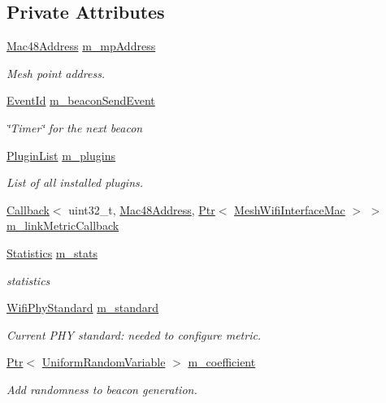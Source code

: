 \subsection*{Private Attributes}
\begin{DoxyCompactItemize}
\item 
\hyperlink{classns3_1_1Mac48Address}{Mac48\+Address} \hyperlink{classns3_1_1MeshWifiInterfaceMac_a268937434a33acb600cd45d4163eba32}{m\+\_\+mp\+Address}
\begin{DoxyCompactList}\small\item\em Mesh point address. \end{DoxyCompactList}\item 
\hyperlink{classns3_1_1EventId}{Event\+Id} \hyperlink{classns3_1_1MeshWifiInterfaceMac_a631ce3de769470f4f3e4bf92a95c54ba}{m\+\_\+beacon\+Send\+Event}
\begin{DoxyCompactList}\small\item\em \char`\"{}\+Timer\char`\"{} for the next beacon \end{DoxyCompactList}\item 
\hyperlink{classns3_1_1MeshWifiInterfaceMac_aef7248bc33791dc738bd042c5459ad88}{Plugin\+List} \hyperlink{classns3_1_1MeshWifiInterfaceMac_ace0a54623c4daa3e9fc7f5570a84683c}{m\+\_\+plugins}
\begin{DoxyCompactList}\small\item\em List of all installed plugins. \end{DoxyCompactList}\item 
\hyperlink{classns3_1_1Callback}{Callback}$<$ uint32\+\_\+t, \hyperlink{classns3_1_1Mac48Address}{Mac48\+Address}, \hyperlink{classns3_1_1Ptr}{Ptr}$<$ \hyperlink{classns3_1_1MeshWifiInterfaceMac}{Mesh\+Wifi\+Interface\+Mac} $>$ $>$ \hyperlink{classns3_1_1MeshWifiInterfaceMac_a618f4cf314716f9b006ff39f37553c5a}{m\+\_\+link\+Metric\+Callback}
\item 
\hyperlink{structns3_1_1MeshWifiInterfaceMac_1_1Statistics}{Statistics} \hyperlink{classns3_1_1MeshWifiInterfaceMac_a3707a5a7f4893aabbbf02b7e95e411c8}{m\+\_\+stats}
\begin{DoxyCompactList}\small\item\em statistics \end{DoxyCompactList}\item 
\hyperlink{group__wifi_ga1299834f4e1c615af3ca738033b76a49}{Wifi\+Phy\+Standard} \hyperlink{classns3_1_1MeshWifiInterfaceMac_ae9c25902a995c9cf053d4cccd63e6e4c}{m\+\_\+standard}
\begin{DoxyCompactList}\small\item\em Current P\+HY standard\+: needed to configure metric. \end{DoxyCompactList}\item 
\hyperlink{classns3_1_1Ptr}{Ptr}$<$ \hyperlink{classns3_1_1UniformRandomVariable}{Uniform\+Random\+Variable} $>$ \hyperlink{classns3_1_1MeshWifiInterfaceMac_af59873849b93cee1429ab81ac93d58a1}{m\+\_\+coefficient}
\begin{DoxyCompactList}\small\item\em Add randomness to beacon generation. \end{DoxyCompactList}\end{DoxyCompactItemize}
